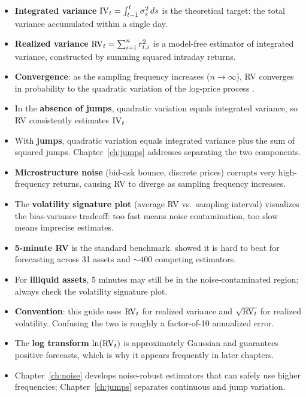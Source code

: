\begin{itemize}[nosep]
  \item \textbf{Integrated variance} $\operatorname{IV}_t = \int_{t-1}^{t} \sigma^2_s\,ds$ is the theoretical target: the total variance accumulated within a single day.

  \item \textbf{Realized variance} $\operatorname{RV}_t = \sum_{i=1}^{n} r^2_{t,i}$ is a model-free estimator of integrated variance, constructed by summing squared intraday returns.

  \item \textbf{Convergence}: as the sampling frequency increases ($n \to \infty$), RV converges in probability to the quadratic variation of the log-price process \citep{ABDL2001, BNS2002}.

  \item In the \textbf{absence of jumps}, quadratic variation equals integrated variance, so RV consistently estimates $\operatorname{IV}_t$.

  \item With \textbf{jumps}, quadratic variation equals integrated variance plus the sum of squared jumps. Chapter~\ref{ch:jumps} addresses separating the two components.

  \item \textbf{Microstructure noise} (bid-ask bounce, discrete prices) corrupts very high-frequency returns, causing RV to diverge as sampling frequency increases.

  \item The \textbf{volatility signature plot} (average RV vs.\ sampling interval) visualizes the bias-variance tradeoff: too fast means noise contamination, too slow means imprecise estimates.

  \item \textbf{5-minute RV} is the standard benchmark. \citet{LPS2015} showed it is hard to beat for forecasting across 31 assets and ${\sim}400$ competing estimators.

  \item For \textbf{illiquid assets}, 5 minutes may still be in the noise-contaminated region; always check the volatility signature plot.

  \item \textbf{Convention}: this guide uses $\operatorname{RV}_t$ for realized variance and $\sqrt{\operatorname{RV}_t}$ for realized volatility. Confusing the two is roughly a factor-of-10 annualized error.

  \item The \textbf{log transform} $\ln(\operatorname{RV}_t)$ is approximately Gaussian and guarantees positive forecasts, which is why it appears frequently in later chapters.

  \item Chapter~\ref{ch:noise} develops noise-robust estimators that can safely use higher frequencies; Chapter~\ref{ch:jumps} separates continuous and jump variation.
\end{itemize}

